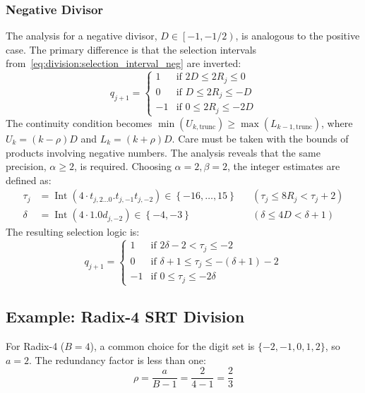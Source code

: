 \documentclass{article}
\DeclareMathOperator{\Int}{Int}
\begin{document}
\subsubsection{Negative Divisor}
\label{sssec:division:radix2_neg}
The analysis for a negative divisor, $D \in \left[-1, -1/2\right)$, is analogous to the positive case.
The primary difference is that the selection intervals from~\cref{eq:division:selection_interval_neg} are inverted:
\begin{equation}
  \label{eq:division:radix2_intervals_neg}
  q_{j+1} =
  \begin{cases}
    1  & \text{if } 2 D \leq 2 R_j \leq 0 \\
    0  & \text{if } D \leq 2 R_j \leq -D \\
    -1 & \text{if } 0 \leq 2 R_j \leq -2 D
  \end{cases}
\end{equation}
The continuity condition becomes $\min(U_{k,\mathrm{trunc}}) \geq \max(L_{k-1,\mathrm{trunc}})$, where $U_k = (k-\rho)D$ and $L_k = (k+\rho)D$.
Care must be taken with the bounds of products involving negative numbers.
The analysis reveals that the same precision, $\alpha \geq 2$, is required.
Choosing $\alpha = 2, \beta = 2$, the integer estimates are defined as:
\begin{align}
  \label{eq:division:radix2_tau_val_neg}
  \tau_j &= \Int(4 \cdot t_{j,2\ldots0}.t_{j,-1}t_{j,-2}) \in \left\{-16, \dots, 15\right\} && (\tau_j \leq 8 R_j < \tau_j + 2) \\
  \label{eq:division:radix2_delta_val_neg}
  \delta &= \Int(4 \cdot 1.0d_{j,-2}) \in \left\{-4, -3\right\} && (\delta \leq 4 D < \delta + 1)
\end{align}
The resulting selection logic is:
\begin{equation}
  \label{eq:division:radix2_logic_neg}
  q_{j+1} =
  \begin{cases}
    1  & \text{if } 2 \delta - 2 < \tau_j \leq -2 \\
    0  & \text{if } \delta + 1 \leq \tau_j \leq -(\delta + 1) - 2 \\
    -1 & \text{if } 0 \leq \tau_j \leq -2 \delta
  \end{cases}
\end{equation}

\subsection{Example: Radix-4 SRT Division}
\label{ssec:division:radix4}
For Radix-4 ($B = 4$), a common choice for the digit set is $\{-2, -1, 0, 1, 2\}$, so $a = 2$.
The redundancy factor is less than one:
\begin{equation}
  \label{eq:division:radix4_rho}
  \rho = \frac{a}{B-1} = \frac{2}{4-1} = \frac{2}{3}
\end{equation}
\end{document}

